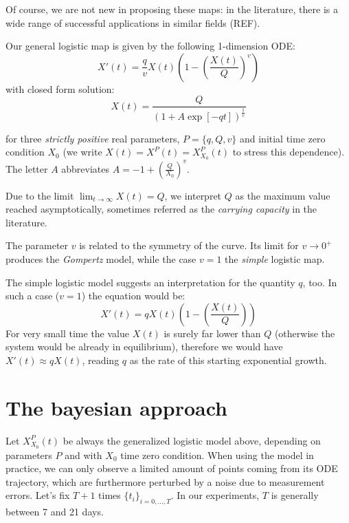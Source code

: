 \documentclass[8pt]{article}
\begin{document}
Of course, we are not new in proposing these maps: in the literature,
there is a wide range of successful applications in similar fields (REF).


Our general logistic map is given by the following 1-dimension ODE:
\begin{equation}
	X'(t) = \frac{q}{v} X(t) 
	\left ( 1 - \left( \frac{X(t)}{Q} \right)^{v}\right )
\end{equation}
with closed form solution:
\begin{equation}
	X(t) = \frac{Q} { (1 + A \exp[-q t])^{\frac{1}{v}}}
\end{equation}

for three \emph{strictly positive} real parameters, 
$P = \{ q, Q, v\}$ and initial time zero condition $X_0$
(we write $X(t) = X^P(t) = X^P_{X_0}(t)$ to stress this dependence).
The letter $A$ abbreviates 
$A = -1 + \left ( \frac{Q} { X_0} \right )^{v}$.


Due to the limit $\lim_{t \to \infty} X(t) = Q$, 
we interpret $Q$ as
the maximum value reached asymptotically, sometimes
referred as the \emph{carrying capacity} in the literature.


The parameter $v$ is related to the symmetry of the curve.
Its limit for $v \to 0^+$ produces the \emph{Gompertz} model,
while the case $v = 1$ the \emph{simple} logistic map.


The simple logistic model suggests an interpretation for the quantity
$q$, too. In such a case ($v=1$) the equation would be:
\begin{equation}
	X'(t) = q X(t) 
	\left ( 1 - \left( \frac{X(t)}{Q} \right)\right )
\end{equation}
For very small time the value $X(t)$ is surely far lower than
$Q$ (otherwise the system would be already in equilibrium), therefore
we would have $X'(t) \approx q X(t)$, reading
$q$ as the rate of this starting exponential growth.


\section{The bayesian approach}
Let $X^P_{X_0}(t)$ be always the generalized logistic model above,
depending on
parameters $P$ and with $X_0$ time zero condition.
When using the model in practice, we can only observe a
limited amount of points coming from its ODE trajectory, 
which are furthermore perturbed by a noise due to measurement
errors.
Let's fix $T+1$ times $\{t_i\}_{i = 0,\dots, T}$.
In our experiments, $T$ is generally between 7 and 21 days.
\end{document}
